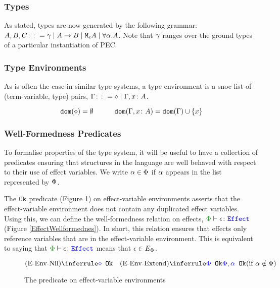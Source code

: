 \documentclass{Report}
\begin{document}
\subsubsection{Types}
As stated, types are now generated by the following grammar: $ A, B, C \gens \ground \mid \ab \mid \mea \mid \all{\a}{A}$. Note that $\g$ ranges over the ground types of a particular instantiation of PEC.


  
\subsubsection{Type Environments}
As is often the case in similar type systems, a type environment is a snoc list of (term-variable, type) pairs, $\G \gens \nil \mid \gax$.

\begin{framed}
    \begin{definition}
        \[
        \dom{\nil} = \emptyset
        \quad\quad\quad
        \dom{\gax} =  \dom{\G}  \cup \left\{x \right\}
    \]
    
    \end{definition}      
\end{framed}


\subsubsection{Well-Formedness Predicates}


To formalise properties of the type system, it will be useful to have a collection of predicates ensuring that structures in the language are well behaved with respect to their use of effect variables. We write $\a \in \P$ if $\a$ appears in the list represented by $\P$.

The $\okt$ predicate (Figure \ref{EffectEnvOk}) on effect-variable environments asserts that the effect-variable environment does not contain any duplicated effect variables. Using this, we can define the well-formedness relation on effects, $\wellformedeffect{\P}{\e}$ (Figure \ref{EffectWellformednes}). In short, this relation ensures that effects only reference variables that are in the effect-variable environment. This is equivalent to saying that $\wellformedeffect{\P}{\e}$ means that $\e\in E_\P$.

\begin{figure}[H]
    \centering
    \begin{framed}
        \[
    \ntreerulez{\pnil}{\ok{\nil}}
\quad
    \condtreeruleI{\pextend}{\ok{\P}}{\ok{\P, \a}}{\a\notin \P}
\]
    \end{framed}
    
    \caption{The \okt\s predicate on effect-variable environments}
    \label{EffectEnvOk}
\end{figure}
\end{document}
